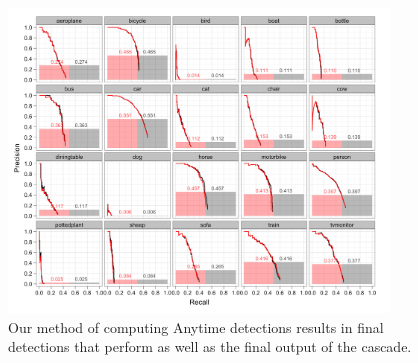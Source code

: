 \begin{figure}[h!]
  \centering
    \includegraphics[width=0.9\textwidth]{../figures/pr_grid_comparison.png}
  \caption{Our method of computing Anytime detections results in final detections that perform as well as the final output of the cascade.}
  \label{fig:pr_grid_comparison}
\end{figure}